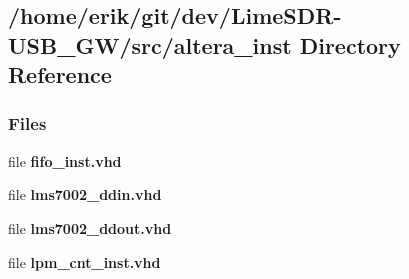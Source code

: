 \subsection{/home/erik/git/dev/\+Lime\+S\+D\+R-\/\+U\+S\+B\+\_\+\+G\+W/src/altera\+\_\+inst Directory Reference}
\label{dir_ad1a6b75f17efbc2f7564e0ca6a91a52}
\subsubsection*{Files}
\begin{DoxyCompactItemize}
\item 
file {\bf fifo\+\_\+inst.\+vhd}
\item 
file {\bf lms7002\+\_\+ddin.\+vhd}
\item 
file {\bf lms7002\+\_\+ddout.\+vhd}
\item 
file {\bf lpm\+\_\+cnt\+\_\+inst.\+vhd}
\end{DoxyCompactItemize}
